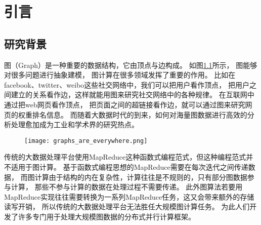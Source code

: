 \chapter{引言}
\section{研究背景}

图（Graph）是一种重要的数据结构，它由顶点与边构成。
如图\ref{fig:graph_important}所示，
图能够对很多问题进行抽象建模，
图计算在很多领域发挥了重要的作用。
比如在facebook、twitter、weibo这些社交网络中，我们可以把用户看作顶点，
把用户之间建立的关系看作边，这样就能用图来研究社交网络中的各种规律。
在互联网中通过把web网页看作顶点，
把页面之间的超链接看作边，就可以通过图来研究网页的权重排名信息。
而随着大数据时代的到来，如何对海量图数据进行高效的分析处理愈加成为工业和学术界的研究热点。

\begin{figure}[!htbp]
  \centering
  \texttt{[image: graphs\_are\_everywhere.png]}
  \label{fig:graph_important}
\end{figure}

传统的大数据处理平台使用MapReduce\cite{mapreduce}这种函数式编程范式，但这种编程范式并不适用于图计算。
基于函数式编程思想的MapReduce需要在每次迭代之间传递数据，
而图计算由于结构的内在复杂性，计算往往是不规则的，只有部分图数据参与计算，
那些不参与计算的数据在处理过程不需要传递。
此外图算法若要用MapReduce实现往往需要转换为一系列MapReduce任务，这又会带来额外的存储读写开销，
所以传统的大数据处理平台无法胜任大规模图计算任务\cite{Malewicz@SIGMOD10}。
为此人们开发了许多专门用于处理大规模图数据的分布式并行计算框架。    
\cite{Malewicz@SIGMOD10, Low@12, Gonzalez@OSDI12, Zhu@OSDI16, Gonzalez@OSDI14, Avery@HS11, Shao@SIGMOD13, 
Chen@EuroSys15, Xie@PPoPP15, Roy@SOSP15, Seo@CloudCom10, Gregor@POOSC15, Hoque@TRIOS13, Teixeira@SOSP15}

